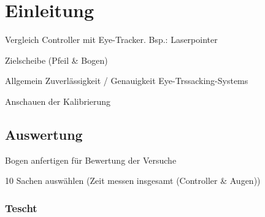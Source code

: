 \chapter{Einleitung}
Vergleich Controller mit Eye-Tracker. Bsp.: Laserpointer 

Zielscheibe (Pfeil \& Bogen)

Allgemein Zuverlässigkeit / Genauigkeit Eye-Trssacking-Systems

Anschauen der Kalibrierung  

\section{Auswertung}
Bogen anfertigen für Bewertung der Versuche

10 Sachen auswählen (Zeit messen insgesamt (Controller \& Augen))

\subsection{Tescht}